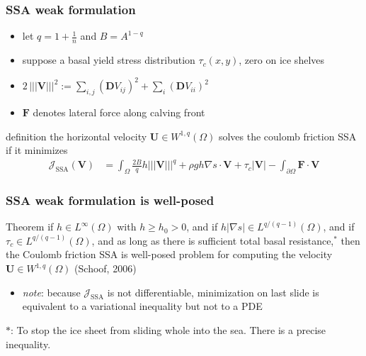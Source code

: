 \documentclass{beamer}
\newcommand{\grad}{\nabla}
\newcommand{\Tnorm}[1]{\left|\!\left|\!\left|#1\right|\!\right|\!\right|}
\begin{document}
\begin{frame}
  \frametitle{SSA weak formulation}

\begin{itemize}
\item let $q = 1+\frac{1}{n}$ and $B = A^{1-q}$
\item suppose a basal yield stress distribution $\tau_c(x,y)$, zero on ice shelves
\item $2\,\Tnorm{\mathbf{V}}^2 := \sum_{i,j} (\mathbf{D}V_{ij})^2 + \sum_{i} (\mathbf{D}V_{ii})^2$
\item $\mathbf{F}$ denotes lateral force along calving front
\end{itemize}

\begin{block}{definition}
the horizontal velocity $\mathbf{U}\in W^{1,q}(\Omega)$ solves the coulomb friction SSA if it minimizes
\small
\begin{align*}
\mathcal{J}_{\text{SSA}}(\mathbf{V}) &= \int_\Omega \frac{2 B}{q} h \Tnorm{\mathbf{V}}^q + \rho g h \grad s \cdot \mathbf{V} + \tau_c |\mathbf{V}| - \int_{\partial\Omega} \mathbf{F} \cdot \mathbf{V}
\end{align*}
\end{block}

\end{frame}


\begin{frame}
  \frametitle{SSA weak formulation is well-posed}

\bigskip
\begin{block}{Theorem}
if $h\in L^\infty(\Omega)$ with $h\ge h_0>0$, and if $h |\grad s| \in L^{q/(q-1)}(\Omega)$, and if  $\tau_c \in L^{q/(q-1)}(\Omega)$, and as long as there is sufficient total basal resistance,$^\ast$ then the Coulomb friction SSA is well-posed problem for computing the velocity $\mathbf{U}\in W^{1,q}(\Omega)$ \hfill \scriptsize (Schoof, 2006)
\end{block}

\bigskip
\begin{itemize}
\item \emph{note}: because $\mathcal{J}_{\text{SSA}}$ is not differentiable, minimization on last slide is equivalent to a variational inequality but not to a PDE
\end{itemize}

\vfill
\scriptsize $\ast$: To stop the ice sheet from sliding whole into the sea.  There is a precise inequality.
\end{frame}
\end{document}
